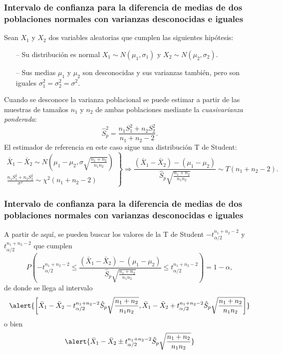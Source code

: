 \begin{frame}
\frametitle{Intervalo de confianza para la diferencia de medias de dos poblaciones normales con varianzas desconocidas
e iguales}
Sean $X_1$ y $X_2$ dos variables aleatorias que cumplen las siguientes hipótesis:
\begin{itemize}
\item[--] Su distribución es normal $X_1\sim N(\mu_1,\sigma_1)$ y $X_2\sim N(\mu_2,\sigma_2)$.
\item[--] Sus medias $\mu_1$ y $\mu_2$ son desconocidas y sus varianzas también, pero son iguales
$\sigma^2_1=\sigma^2_2=\sigma^2$.
\end{itemize}
Cuando se desconoce la varianza poblacional se puede estimar a partir de las muestras de tamaños $n_1$ y $n_2$  de ambas poblaciones mediante la \emph{cuasivarianza ponderada}:
\[
\hat{S}^2_p = \frac{n_1S^2_1+n_2S^2_2}{n_1+n_2-2}.
\]
El estimador de referencia en este caso sigue una distribución T de Student:
\[
\left.
\begin{array}{l}
\bar{X}_1-\bar{X}_2\sim N\left(\mu_1-\mu_2,\sigma\sqrt{\frac{n_1+n_2}{n_1n_2}} \right)\\
\displaystyle \frac{n_1S_1^2+n_2S_2^2}{\sigma^2} \sim \chi^2(n_1+n_2-2)
\end{array}
\right\}
\Rightarrow
\frac{(\bar{X}_1-\bar{X}_2)-(\mu_1-\mu_2)}{\hat{S}_p\sqrt{\frac{n_1+n_2}{n_1n_2}}} \sim T(n_1+n_2-2).
\]
\end{frame}


\begin{frame}
\frametitle{Intervalo de confianza para la diferencia de medias de dos poblaciones normales con varianzas
desconocidas e iguales}
A partir de aquí, se pueden buscar los valores de la T de Student
$-t^{n_1+n_2-2}_{\alpha/2}$ y $t^{n_1+n_2-2}_{\alpha/2}$ que cumplen
\[
P\left(-t^{n_1+n_2-2}_{\alpha/2}\leq \frac{(\bar{X}_1-\bar{X}_2)-(\mu_1-\mu_2)}{\hat{S}_p\sqrt{\frac{n_1+n_2}{n_1n_2}}}
\leq t^{n_1+n_2-2}_{\alpha/2}\right) = 1-\alpha,
\]
de donde se llega al intervalo
\[
\alert{\left[\bar{X}_1-\bar{X}_2-t^{n_1+n_2-2}_{\alpha/2}\hat{S}_p\sqrt{\frac{n_1+n_2}{n_1n_2}},\bar{X}_1-\bar{X}_2+t^{n_1+n_2-2}_{\alpha/2}\hat{S}_p\sqrt{\frac{n_1+n_2}{n_1n_2}}\right]}
\]
o bien
\[
\alert{\bar{X}_1-\bar{X}_2\pm t^{n_1+n_2-2}_{\alpha/2}\hat{S}_p\sqrt{\frac{n_1+n_2}{n_1n_2}}}
\]
\end{frame}


